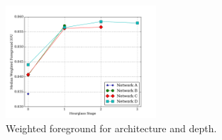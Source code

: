 \renewcommand{\captiontitle}{Weighted foreground \IoU{} for architecture and depth}
\begin{figure}
\begin{center}
\includegraphics[width=0.5\textwidth]{./data/trendline.pdf}
\caption[\captiontitle]{\captiontitle{}.}
\label{fig:hourglass-accuracy}
\end{center}
\end{figure}
